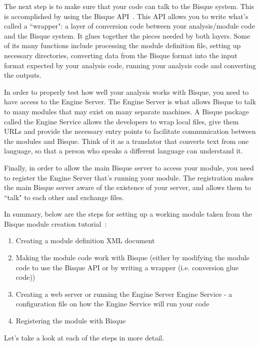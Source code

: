\documentclass[12pt]{article}
\begin{document}
The next step is to make sure that your code can talk to the Bisque system. This is accomplished by using the Bisque API~\cite{BisqueAPI}. This API allows you to write what's called  a ``wrapper": a layer of conversion code between your analysis/module code and the Bisque system. It glues together the pieces needed by both layers. Some of its many functions include processing the module definition file, setting up necessary directories, converting data from the Bisque format into the input format expected by your analysis code, running your analysis code and converting the outputs. 

In order to properly test how well your analysis works with Bisque, you need to have access to the Engine Server. The Engine Server is what allows
Bisque to talk to many modules that may exist on many separate machines.
A Bisque package called the Engine Service allows the developers to wrap local files, give them URLs and provide the necessary entry points to facilitate communication between the modules and Bisque. Think of it as a translator that converts text from one language, so that a person who speaks a different language can understand it.

Finally, in order to allow the main Bisque server to access your module, you need to register the Engine Server that's running your module. The registration makes the main Bisque server aware of the existence of your server, and allows them to ``talk" to each other and exchange files.


In summary, below are the steps for setting up a working module taken from the Bisque module creation tutorial~\cite{Bisque-module-creation}:
\begin{enumerate}
\item Creating a module definition XML document
\item Making the module code work with Bisque (either by modifying the module code to use the Bisque API or by writing a wrapper (i.e. conversion glue code))
\item Creating a web server or running the Engine Server
\subitem Engine Service - a configuration file on how the Engine Service will run your code 
\item Registering the module with Bisque 
\end{enumerate}

Let's take a look at each of the steps in more detail.







{\small


}
\end{document}
